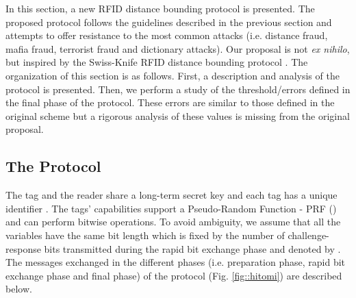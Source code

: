 \documentclass{article}
\begin{document}
In this section, a new RFID distance bounding protocol is presented. The proposed protocol follows the guidelines described in the previous section and attempts to offer resistance to the most common attacks (i.e. distance fraud, mafia fraud, terrorist fraud and dictionary attacks).  Our proposal is not {\em ex nihilo}, but inspired by the Swiss-Knife RFID distance bounding protocol \cite{KimAKSP-2008-icisc}. The organization of this section is as follows.  First, a description and analysis of the protocol is presented. Then, we perform a study of the threshold/errors defined in the final phase of the protocol. These errors are similar to those defined in the original scheme but a rigorous analysis of these values is missing from the original proposal.

\subsection{The Protocol}
The tag and the reader share a long-term secret key  and each tag has a unique identifier . The tags' capabilities support a Pseudo-Random Function - PRF ()
and can perform bitwise operations. To avoid ambiguity, we assume that all the variables have the same bit length which is fixed by the number of challenge-response bits transmitted during the rapid bit exchange phase and denoted by .  The messages exchanged in the different phases (i.e. preparation phase, rapid bit exchange phase and final phase) of the protocol (Fig. \ref{fig::hitomi}) are described below.
\end{document}
